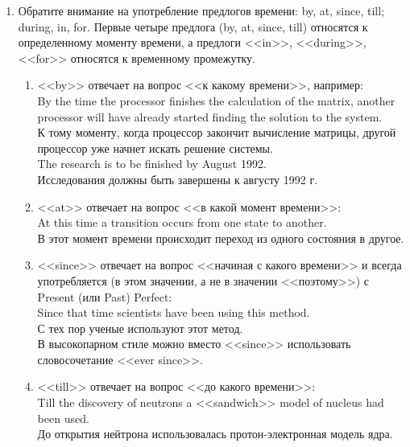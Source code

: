 \documentclass[a5paper, 10pt, twoside, numbers=enddot]{scrartcl}
\begin{document}
\begin{enumerate}
  \item Обратите внимание на употребление предлогов времени: by, at, since, till; during, in, for.
    Первые четыре предлога (by, at, since, till) относятся к определенному моменту времени, а
    предлоги <<in>>, <<during>>, <<for>> относятся к временному промежутку.
    \begin{enumerate}
      \item <<by>> отвечает на вопрос <<к какому времени>>, например:\\ [4pt]
        \textsf{
          By the time the processor finishes the calculation of the matrix, another processor will
          have already started finding the solution to the system.\\
          К тому моменту, когда процессор закончит вычисление матрицы, другой процессор уже начнет
          искать решение системы.\\ [4pt]
          The research is to be finished by August 1992.\\
          Исследования должны быть завершены к августу 1992 г.
        }

      \item <<at>> отвечает на вопрос <<в какой момент времени>>:\\ [4pt]
        \textsf{
          At this time a transition occurs from one state to another.\\
          В этот момент времени происходит переход из одного состояния в другое.
        }

      \item <<since>> отвечает на вопрос <<начиная с какого времени>> и всегда употребляется (в этом
        значении, а не в значении <<поэтому>>) с Present (или Past) Perfect:\\ [4pt]
        \textsf{
          Since that time scientists have been using this method.\\
          С тех пор ученые используют этот метод.\\ [4pt]
        }
        В высокопарном стиле можно вместо <<since>> использовать словосочетание <<ever since>>.

      \item <<till>> отвечает на вопрос <<до какого времени>>:\\ [4pt]
        \textsf{
          Till the discovery of neutrons a <<sandwich>> model of nucleus had been used.\\
          До открытия нейтрона использовалась протон-электронная модель ядра.
        }


\end{enumerate}
\end{enumerate}
\end{document}
